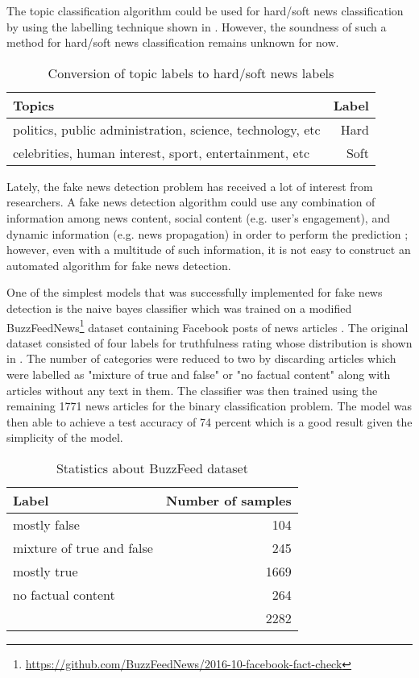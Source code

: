 The topic classification algorithm could be used for hard/soft news classification by using the labelling technique shown in . However, the soundness of such a method for hard/soft news classification remains unknown for now.

\begin{table}[h]
\begin{center}
\caption{Conversion of topic labels to hard/soft news labels}
\label{tbl:topics_to_hard_soft}
\begin{tabular}{lr}
\toprule 
Topics&Label \\
\midrule 
politics, public administration, science, technology, etc & Hard\\
\hline
celebrities, human interest, sport, entertainment, etc & Soft\\
\bottomrule
\end{tabular}
\end{center}
\end{table}

Lately, the fake news detection problem has received a lot of interest from researchers. A fake news detection algorithm could use any combination of information among news content, social content (e.g. user's engagement), and dynamic information (e.g. news propagation) in order to perform the prediction \cite{shu2018fakenewsnet}; however, even with a multitude of such information, it is not easy to construct an automated algorithm for fake news detection\cite{shu2017fake}.

One of the simplest models that was successfully implemented for fake news detection is the naive bayes classifier which was trained on a modified BuzzFeedNews\footnote{\url{https://github.com/BuzzFeedNews/2016-10-facebook-fact-check}} dataset containing Facebook posts of news articles \cite{granik2017fake}. The original dataset consisted of four labels for truthfulness rating whose distribution is shown in . The number of categories were reduced to two by discarding articles which were labelled as "mixture of true and false" or "no factual content" along with articles without any text in them. The classifier was then trained using the remaining 1771 news articles for the binary classification problem. The model was then able to achieve a test accuracy of 74 percent which is a good result given the simplicity of the model.

\begin{table}[h]
\begin{center}
\caption{Statistics about BuzzFeed dataset}
\label{tbl:buzzfeed_dataset}
\begin{tabular}{lr}
\toprule 
Label&Number of samples \\
\midrule 
mostly false&104 \\
mixture of true and false&245 \\
mostly true&1669 \\
no factual content&264 \\
\midrule
&2282 \\
\bottomrule
\end{tabular}
\end{center}
\end{table}


